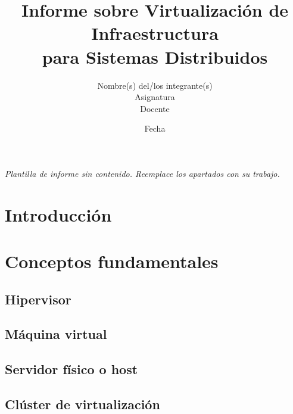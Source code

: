\documentclass[12pt,a4paper]{article}
\title{%
  \textbf{Informe sobre Virtualización de Infraestructura}\\[0.3em]
  \large para Sistemas Distribuidos
}
\author{Nombre(s) del/los integrante(s) \\ Asignatura \\ Docente}
\date{Fecha}
\begin{document}

\maketitle
\thispagestyle{empty}

\vspace{2cm}
\begin{center}
  \textit{\large Plantilla de informe sin contenido.
    Reemplace los apartados con su trabajo.}
\end{center}

\newpage
\tableofcontents
\newpage

\section{Introducción}
\label{sec:introduccion}

\section{Conceptos fundamentales}
\label{sec:conceptos}

\subsection{Hipervisor}

\subsection{Máquina virtual}

\subsection{Servidor físico o host}

\subsection{Clúster de virtualización}
\end{document}
